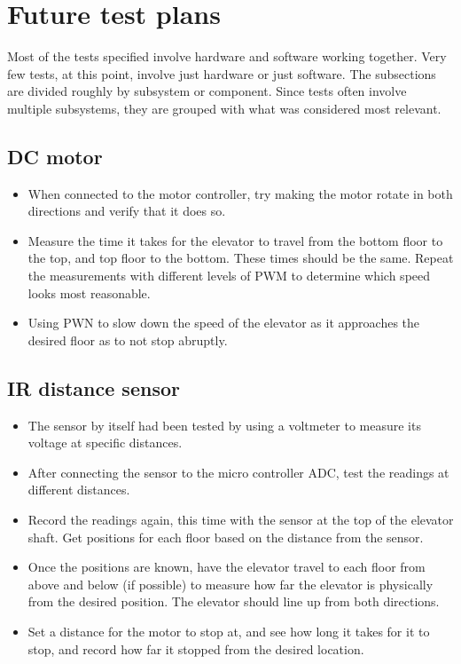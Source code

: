 \documentclass{article}
\begin{document}
	
	\section{Future test plans}
	Most of the tests specified involve hardware and software working together. Very few tests, at this point, involve just hardware or just software. The subsections are divided roughly by subsystem or component. Since tests often involve multiple subsystems, they are grouped with what was considered most relevant.
	    \subsection{DC motor}
	    \begin{itemize}
            \item When connected to the motor controller, try making the motor rotate in both directions and verify that it does so.
            \item Measure the time it takes for the elevator to travel from the bottom floor to the top, and top floor to the bottom. These times should be the same. Repeat the measurements with different levels of PWM to determine which speed looks most reasonable.
            \item Using PWN to slow down the speed of the elevator as it approaches the desired floor as to not stop abruptly.  
        \end{itemize}
        
	    \subsection{IR distance sensor}
	    \begin{itemize}
	        \item The sensor by itself had been tested by using a voltmeter to measure its voltage at specific distances.
	        \item After connecting the sensor to the micro controller ADC, test the readings at different distances.
	        \item Record the readings again, this time with the sensor at the top of the elevator shaft. Get positions for each floor based on the distance from the sensor.
	        \item Once the positions are known, have the elevator travel to each floor from above and below (if possible) to measure how far the elevator is physically from the desired position. The elevator should line up from both directions.
	        \item Set a distance for the motor to stop at, and see how long it takes for it to stop, and record how far it stopped from the desired location.
	    \end{itemize}
	    
\end{document}
